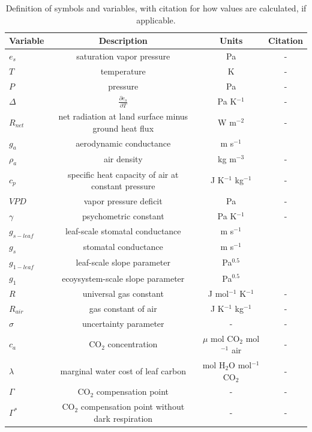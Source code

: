 \documentclass[draft,linenumbers]{agujournal}
\begin{document}
\begin{table}
  \caption{Definition of symbols and variables, with citation for how
    values are calculated, if applicable.}
  \label{definitions}
  \centering \small
  \begin{tabular}{l c c c}
    \hline
    Variable & Description & Units & Citation \\
    \hline
    $e_s$  & saturation vapor pressure & Pa  & - \\ 
    $T$  & temperature  & K & - \\
    $P$  & pressure & Pa  & - \\
    $\Delta$  & $\frac{\partial e_s}{\partial T}$ & Pa K$^{-1}$ & - \\
    $R_{net}$  & net radiation at land surface minus ground heat flux & W m$^{-2}$   & - \\
    $g_a$  & aerodynamic conductance & m s$^{-1}$  & \citet{Shuttleworth_2012} \\
    $\rho_a$  & air density & kg m$^{-3}$  & - \\
    $c_p$  & specific heat capacity of air at constant pressure & J K$^{-1}$ kg$^{-1}$ & - \\
    $VPD$  & vapor pressure deficit & Pa  & - \\
    $\gamma$  & psychometric constant & Pa K$^{-1}$   & - \\
    $g_{s-leaf}$  & leaf-scale stomatal conductance & m s$^{-1}$  & \citet{MEDLYN_2011} \\
    $g_{s}$  &  stomatal conductance & m s$^{-1}$
                                   & \citet{Medlyn_2017} \\
    $g_{1-leaf}$  & leaf-scale slope parameter & Pa$^{0.5}$
                                   & \citet{MEDLYN_2011} \\
    $g_{1}$  & ecoysystem-scale slope parameter & Pa$^{0.5}$ & \citet{MEDLYN_2017} \\
    $R$ & universal gas constant & J mol$^{-1}$ K$^{-1}$ & - \\
    $R_{air}$ & gas constant of air & J  K$^{-1}$ kg$^{-1}$ & - \\
    $\sigma$ & uncertainty parameter & -& - \\
    $c_a$ & CO$_2$ concentration & $\mu$ mol CO$_2$ mol$^{-1}$ air& - \\
    $\lambda$ & marginal water cost of leaf carbon & mol H$_2$O mol$^{-1}$ CO$_2$ & - \\
    $\Gamma$ & CO$_2$ compensation point & - & - \\
    $\Gamma^*$ & CO$_2$ compensation point without dark respiration & - & - \\
    \hline
  \end{tabular}
\end{table}
\end{document}
